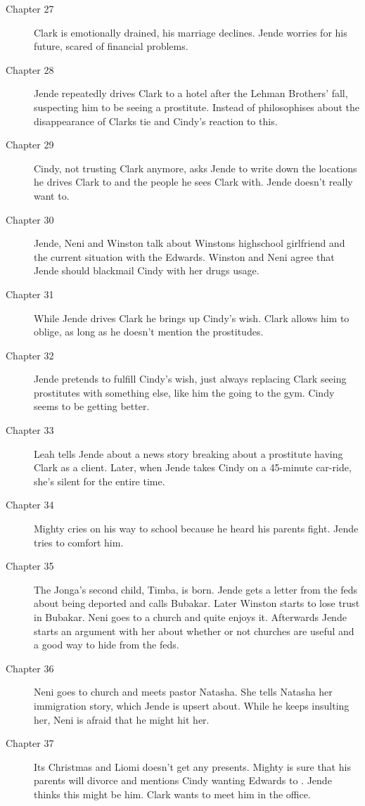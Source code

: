 \documentclass{article}
\begin{document}
\begin{description}
 \item[Chapter 27] Clark is emotionally drained, his marriage declines. Jende worries for his future, scared of financial problems.
 \item[Chapter 28] Jende repeatedly drives Clark to a hotel after the Lehman Brothers' fall, suspecting him to be seeing a prostitute. Instead of philosophises about the disappearance of Clarks tie and Cindy's reaction to this.
 \item[Chapter 29] Cindy, not trusting Clark anymore, asks Jende to write down the locations he drives Clark to and the people he sees Clark with. Jende doesn't really want to. 
 \item[Chapter 30] Jende, Neni and Winston talk about Winstons highschool girlfriend and the current situation with the Edwards. Winston and Neni agree that Jende should blackmail Cindy with her drugs usage.
 \item[Chapter 31] While Jende drives Clark he brings up Cindy's wish. Clark allows him to oblige, as long as he doesn't mention the prostitudes.
 \item[Chapter 32] Jende pretends to fulfill Cindy's wish, just always replacing Clark seeing prostitutes with something else, like him the going to the gym. Cindy seems to be getting better.
 \item[Chapter 33] Leah tells Jende about a news story breaking about a prostitute having Clark as a client. Later, when Jende takes Cindy on a 45-minute car-ride, she's silent for the entire time.
 \item[Chapter 34] Mighty cries on his way to school because he heard his parents fight. Jende tries to comfort him.
 \item[Chapter 35] The Jonga's second child, Timba, is born. Jende gets a letter from the feds about being deported and calls Bubakar. Later Winston starts to lose trust in Bubakar. Neni goes to a church and quite enjoys it. Afterwards Jende starts an argument with her about whether or not churches are useful and a good way to hide from the feds.
 \item[Chapter 36] Neni goes to church and meets pastor Natasha. She tells Natasha her immigration story, which Jende is upsert about. While he keeps insulting her, Neni is afraid that he might hit her.
 \item[Chapter 37] Its Christmas and Liomi doesn't get any presents. Mighty is sure that his parents will divorce and mentions Cindy wanting Edwards to . Jende thinks this  might be him. Clark wants to meet him in the office.

\end{description}
\end{document}
